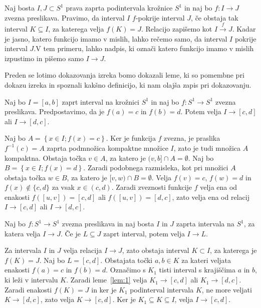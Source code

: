 \documentclass[../TG_magistrsko_delo_sections.tex]{subfiles}
\begin{document}
\begin{definicija}\label{def:pokritja}
Naj bosta $I, J \subset S^1$ prava zaprta podintervala krožnice $S^1$ in naj bo $f: I \to J$ zvezna preslikava. Pravimo, da interval $I$ $f$-pokrije interval $J$, če obstaja tak interval $K \subseteq I$, za katerega velja $f(K) = J$. Relacijo zapišemo kot $I \xrightarrow{f} J$. Kadar je jasno, katero funkcijo imamo v mislih, lahko rečemo samo, da interval $I$ pokrije interval $J$.V tem primeru, lahko nadpis, ki označi katero funkcijo imamo v mislih izpustimo in pišemo samo $I \to J$.
\end{definicija}

Preden se lotimo dokazovanja izreka bomo dokazali leme, ki so pomembne pri dokazu izreka in spoznali kakšno definicijo, ki nam olajša zapis pri dokazovanju.

\begin{lema}\label{lem:1}					%
Naj bo $I=[a, b]$ zaprt interval na krožnici $S^1$ in naj bo $f : S^1 \to S^1$ zvezna preslikava. Predpostavimo, da je $f(a) = c$ in $f(b) =d$. Potem velja $I \to [c, d]$ ali $I \to [d, c]$.
\end{lema}

\begin{dokaz}
Naj bo $A = \left\{x \in I; f(x) = c \right\}$. Ker je funkcija $f$ zvezna, je praslika $f^{-1}(c) = A$ zaprta podmnožica kompaktne množice $I$, zato je tudi množica $A$ kompaktna. Obstaja točka $v \in A$, za katero je $(v, b] \cap A = \emptyset$. Naj bo $B = \left\{x \in I; f(x) = d \right\}$. Zaradi podobnega razmisleka, kot pri množici $A$ obstaja točka $w \in B$, za katero je $[v, w) \cap B = \emptyset$. Velja $f(v) = c$, $f(w)=d$ in $f(x) \notin \{c, d\}$ za vsak $x \in (c, d)$. Zaradi zveznosti funkcije $f$ velja ena od enakosti $f([u, v]) = [c, d]$ ali $f([u, v]) = [d, c]$, zato velja ena od relacij $I \to [c, d]$ ali $I \to [d, c]$.
\end{dokaz}

\begin{lema}\label{lem:2}		%
Naj bo $f : S^1 \to S^1$ zvezna preslikava in naj bosta $I$ in $J$ zaprta intervala na $S^1$, za katera velja $I \to J$. Če je $L \subseteq J$ zaprt interval, potem velja $I \to L$.
\end{lema}

\begin{dokaz}
Za intervala $I$ in $J$ velja relacija $I \to J$, zato obstaja interval $K \subset I$, za katerega je $f(K) = J$. Naj bo $L = [c, d]$. Obstajata točki $a, b \in K$ za kateri veljata enakosti $f(a) = c$ in $f(b)=d$. Označimo s $K_1$ tisti interval s krajiščima $a$ in $b$, ki leži v intervalu $K$. Zaradi leme~\ref{lem:1} velja $K_1 \to [c, d]$ ali $K_1 \to [d, c]$. Zaradi enakosti $f(K) = J$ in ker je $K_1$ podinterval intervala $K$, ne more veljati $K \to [d, c]$, zato velja $K \to [c, d]$. Ker je $K_1 \subseteq K \subseteq I$, velja $I \to [c, d]$.
\end{dokaz}
\end{document}

